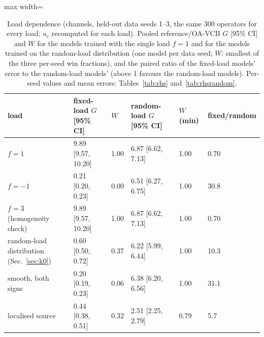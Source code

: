 \begin{table}[tbp]\centering\footnotesize\setlength{\tabcolsep}{4pt}
\caption{Load dependence (channels, held-out data seeds 1--3, the same 300 operators for every load; $u_c$ recomputed for each load). Pooled reference/OA-VCB $G$ [95\% CI] and $W$ for the models trained with the single load $f=1$ and for the models trained on the random-load distribution (one model per data seed; $W$: smallest of the three per-seed win fractions), and the paired ratio of the fixed-load models' error to the random-load models' (above 1 favours the random-load models). Per-seed values and mean errors: Tables~\ref{tab:rhs} and~\ref{tab:rhsrandom}.}\label{tab:loads}
\begin{adjustbox}{max width=\linewidth}
\begin{tabular}{llllll}\toprule
load & fixed-load $G$ [95\% CI] & $W$ & random-load $G$ [95\% CI] & $W$ (min) & fixed/random \\\midrule
$f=1$ & 9.89 [9.57, 10.20] & 1.00 & 6.87 [6.62, 7.13] & 1.00 & 0.70 \\
$f=-1$ & 0.21 [0.20, 0.23] & 0.00 & 6.51 [6.27, 6.75] & 1.00 & 30.8 \\
$f=3$ (homogeneity check) & 9.89 [9.57, 10.20] & 1.00 & 6.87 [6.62, 7.13] & 1.00 & 0.70 \\
random-load distribution (Sec.~\ref{sec:k0}) & 0.60 [0.50, 0.72] & 0.37 & 6.22 [5.99, 6.44] & 1.00 & 10.3 \\
smooth, both signs & 0.20 [0.19, 0.23] & 0.06 & 6.38 [6.20, 6.56] & 1.00 & 31.1 \\
localised source & 0.44 [0.38, 0.51] & 0.32 & 2.51 [2.25, 2.79] & 0.79 & 5.7 \\
\bottomrule\end{tabular}
\end{adjustbox}
\end{table}
